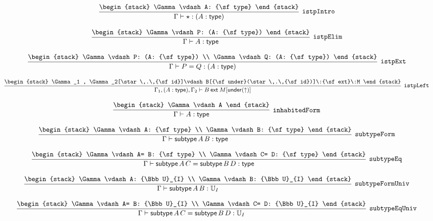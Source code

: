\[
\infer[{\tt istpIntro}]{\Gamma \vdash \star : (A: {\sf type})}{
\begin{stack}
\Gamma \vdash A: {\sf type}
\end{stack}}
\]

\[
\infer[{\tt istpElim}]{\Gamma \vdash A: {\sf type}}{
\begin{stack}
\Gamma \vdash P: (A: {\sf type})
\end{stack}}
\]

\[
\infer[{\tt istpExt}]{\Gamma \vdash P= Q: (A: {\sf type})}{
\begin{stack}
\Gamma \vdash P: (A: {\sf type})
\\
\Gamma \vdash Q: (A: {\sf type})
\end{stack}}
\]

\[
\infer[{\tt istpLeft}]{\Gamma_1 ,(A: {\sf type}), \Gamma_2 \vdash B\:{\sf ext}\:M[{\sf under}(\uparrow )]}{
\begin{stack}
\Gamma_1 , \Gamma_2[\star \,.\,{\sf id}]\vdash B[{\sf under}(\star \,.\,{\sf id})]\:{\sf ext}\:M
\end{stack}}
\]

\[
\infer[{\tt inhabitedForm}]{\Gamma \vdash A: {\sf type}}{
\begin{stack}
\Gamma \vdash A
\end{stack}}
\]

\[
\infer[{\tt subtypeForm}]{\Gamma \vdash {\sf subtype}\,A\,B: {\sf type}}{
\begin{stack}
\Gamma \vdash A: {\sf type}
\\
\Gamma \vdash B: {\sf type}
\end{stack}}
\]

\[
\infer[{\tt subtypeEq}]{\Gamma \vdash {\sf subtype}\,A\,C= {\sf subtype}\,B\,D: {\sf type}}{
\begin{stack}
\Gamma \vdash A= B: {\sf type}
\\
\Gamma \vdash C= D: {\sf type}
\end{stack}}
\]

\[
\infer[{\tt subtypeFormUniv}]{\Gamma \vdash {\sf subtype}\,A\,B: {\Bbb U}_{I}}{
\begin{stack}
\Gamma \vdash A: {\Bbb U}_{I}
\\
\Gamma \vdash B: {\Bbb U}_{I}
\end{stack}}
\]

\[
\infer[{\tt subtypeEqUniv}]{\Gamma \vdash {\sf subtype}\,A\,C= {\sf subtype}\,B\,D: {\Bbb U}_{I}}{
\begin{stack}
\Gamma \vdash A= B: {\Bbb U}_{I}
\\
\Gamma \vdash C= D: {\Bbb U}_{I}
\end{stack}}
\]


